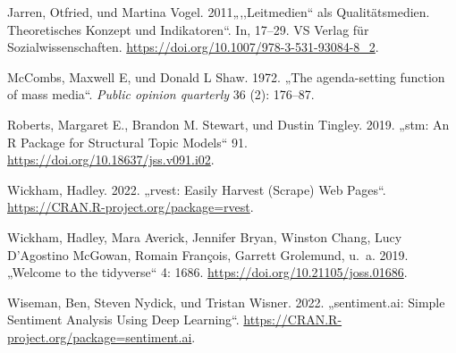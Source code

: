 \documentclass[
  11pt,
]{article}
\newlength{\cslhangindent}
\newlength{\cslentryspacingunit} %
\newenvironment{CSLReferences}[2] %
 {%
  \setlength{\parindent}{0pt}
  \ifodd #1
  \let\oldpar\par
  \def\par{\hangindent=\cslhangindent\oldpar}
  \fi
  \setlength{\parskip}{#2\cslentryspacingunit}
 }%
 {}
\begin{document}
\begin{CSLReferences}{1}{0}
\leavevmode{}%
Jarren, Otfried, und Martina Vogel. 2011{„{,,}Leitmedien{``} als
Qualitätsmedien. Theoretisches Konzept und Indikatoren``}. In, 17--29.
VS Verlag für Sozialwissenschaften.
\url{https://doi.org/10.1007/978-3-531-93084-8_2}.

\leavevmode{}%
McCombs, Maxwell E, und Donald L Shaw. 1972. {„The agenda-setting
function of mass media``}. \emph{Public opinion quarterly} 36 (2):
176--87.

\leavevmode{}%
Roberts, Margaret E., Brandon M. Stewart, und Dustin Tingley. 2019.
{„{\textbraceleft}stm{\textbraceright}: An
{\textbraceleft}R{\textbraceright} Package for Structural Topic
Models``} 91. \url{https://doi.org/10.18637/jss.v091.i02}.

\leavevmode{}%
Wickham, Hadley. 2022. {„rvest: Easily Harvest (Scrape) Web Pages``}.
\url{https://CRAN.R-project.org/package=rvest}.

\leavevmode{}%
Wickham, Hadley, Mara Averick, Jennifer Bryan, Winston Chang, Lucy
D'Agostino McGowan, Romain François, Garrett Grolemund, u.~a. 2019.
{„Welcome to the {\textbraceleft}tidyverse{\textbraceright}``} 4: 1686.
\url{https://doi.org/10.21105/joss.01686}.

\leavevmode{}%
Wiseman, Ben, Steven Nydick, und Tristan Wisner. 2022. {„sentiment.ai:
Simple Sentiment Analysis Using Deep Learning``}.
\url{https://CRAN.R-project.org/package=sentiment.ai}.

\end{CSLReferences}
\end{document}
